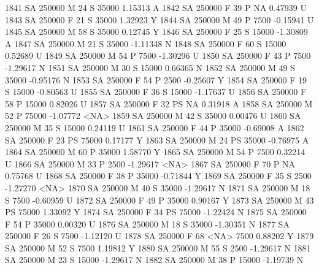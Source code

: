 \documentclass{article}
\begin{document}
\begin{Schunk}
\begin{Soutput}
1841     SA     250000   M  24         S  35000   1.15313    A
1842     SA     250000   F  39         P     NA   0.47939    U
1843     SA     250000   F  21         S  35000   1.32923    Y
1844     SA     250000   M  49         P   7500  -0.15941    U
1845     SA     250000   M  58         S  35000   0.12745    Y
1846     SA     250000   F  25         S  15000  -1.30809    A
1847     SA     250000   M  21         S  35000  -1.11348    N
1848     SA     250000   F  60         S  15000   0.52689    U
1849     SA     250000   M  54         P   7500  -1.30296    U
1850     SA     250000   F  43         P   7500  -1.29617    N
1851     SA     250000   M  30         S  15000   0.66365    N
1852     SA     250000   M  49         S  35000  -0.95176    N
1853     SA     250000   F  54         P   2500  -0.25607    Y
1854     SA     250000   F  19         S  15000  -0.80563    U
1855     SA     250000   F  36         S  15000  -1.17637    U
1856     SA     250000   F  58         P  15000   0.82026    U
1857     SA     250000   F  32        PS     NA   0.31918    A
1858     SA     250000   M  52         P  75000  -1.07772 <NA>
1859     SA     250000   M  42         S  35000   0.00476    U
1860     SA     250000   M  35         S  15000   0.24119    U
1861     SA     250000   F  44         P  35000  -0.69008    A
1862     SA     250000   F  23        PS  75000   0.17177    Y
1863     SA     250000   M  24        PS  35000  -0.76975    A
1864     SA     250000   M  60         P  35000   1.58770    Y
1865     SA     250000   M  54         P   7500   0.32214    U
1866     SA     250000   M  33         P   2500  -1.29617 <NA>
1867     SA     250000   F  70         P     NA   0.75768    U
1868     SA     250000   F  38         P  35000  -0.71844    Y
1869     SA     250000   F  35         S   2500  -1.27270 <NA>
1870     SA     250000   M  40         S  35000  -1.29617    N
1871     SA     250000   M  18         S   7500  -0.60959    U
1872     SA     250000   F  49         P  35000   0.90167    Y
1873     SA     250000   M  43        PS  75000   1.33092    Y
1874     SA     250000   F  34        PS  75000  -1.22424    N
1875     SA     250000   F  54         P  35000   0.00320    U
1876     SA     250000   M  18         S  35000  -1.30351    N
1877     SA     250000   F  26         S   7500  -1.12120    U
1878     SA     250000   F  68      <NA>   7500   0.88202    Y
1879     SA     250000   M  52         S   7500   1.19812    Y
1880     SA     250000   M  55         S   2500  -1.29617    N
1881     SA     250000   M  23         S  15000  -1.29617    N
1882     SA     250000   M  38         P  15000  -1.19739    N

\end{Soutput}
\end{Schunk}
\end{document}

